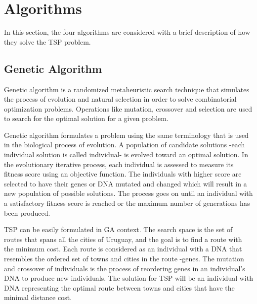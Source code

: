 \documentclass[twocolumn]{article}
\begin{document}
	\section{Algorithms}
	In this section, the four algorithms are considered with a brief description of how they solve the TSP problem.
	\subsection{Genetic Algorithm}
	
	Genetic algorithm is a randomized metaheuristic search technique that simulates the process of evolution and natural selection in order to solve combinatorial optimization problems. Operations like mutation, crossover and selection are used to search for the optimal solution for a given problem.
	
	Genetic algorithm formulates a problem using the same terminology that is used in the biological process of evolution. A population of candidate solutions -each individual solution is called individual- is evolved toward an optimal solution. In the evolutionary iterative process, each individual is assessed to measure its fitness score using an objective function. The individuals with higher score are selected to have their genes or DNA mutated and changed which will result in a new population of possible solutions. The process goes on until an individual with a satisfactory fitness score is reached or the maximum number of generations has been produced.
	
	TSP can be easily formulated in GA context. The search space is the set of routes that spans all the cities of Uruguay, and the goal is to find a route with the minimum cost. Each route is considered as an individual with a DNA that resembles the ordered set of towns and cities in the route -genes. The mutation and crossover of individuals is the process of reordering genes in an individual's DNA to produce new individuals. The solution for TSP will be an individual with DNA representing the optimal route between towns and cities that have the minimal distance cost.
	
\end{document}

